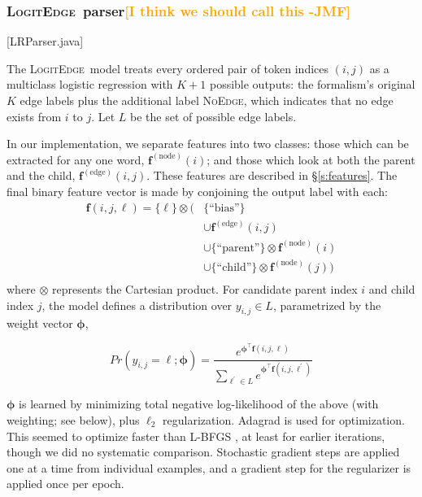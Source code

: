 \documentclass[11pt]{article}
\newcommand{\jmf}[1]{\textcolor{orange}{[#1 -JMF]}}
\newcommand{\codenote}[1]{\textcolor{PineGreen}{[#1]}}
\newcommand{\logitedge}{\textsc{LogitEdge}}
\newcommand{\noedge}{\textsc{NoEdge}}
\begin{document}
\subsubsection{\logitedge\ parser\jmf{I think we should call this }}
\label{s:logitedge}


\codenote{LRParser.java}

The \logitedge\ model treats every ordered pair of token indices $(i, j)$ as a
multiclass logistic regression with $K+1$ possible outputs:
the formalism's original $K$ edge labels plus the additional label \noedge,
which indicates that no edge exists from $i$ to $j$.
Let $L$ be the set of possible edge labels.

In our implementation, we separate features into two classes:
those which can be extracted for any one word, $\bm{f}^{(\text{node})}(i)$;
and those which look at both the parent and the child,
$\bm{f}^{(\text{edge})}(i, j)$.
These features are described in \S\ref{s:features}.
The final binary feature vector is made by conjoining the output label with
each:
\begin{align*} 
\bm{f}(i, j, \ell) =
\{ \ell \} \otimes (& 
	\{ \text{``bias''} \} \\
	& \cup \bm{f}^{(\text{edge})}(i, j) \\
	& \cup \{ \text{``parent''} \} \otimes \bm{f}^{(\text{node})}(i) \\
	& \cup \{ \text{``child''} \} \otimes \bm{f}^{(\text{node})}(j)
)\\
\end{align*}
\noindent
where  $\otimes$ represents the Cartesian product.
For candidate parent index $i$ and child index $j$, the model defines a
distribution over $y_{i,j} \in L$, parametrized by the weight vector $\bm\phi$,

\begin{equation}
  Pr(y_{i,j}=\ell; \bm\phi)  = \frac{
  	e^{\bm\phi^\top \bm{f}(i, j, \ell)}
  } {
  	\sum_{\ell^\prime \in L} {
  		e^{\bm\phi^\top \bm{f}(i, j, \ell^\prime)}
  	}
  }
\end{equation}

\noindent
$\bm\phi$ is learned by minimizing total negative log-likelihood of the above
(with weighting; see below), plus $\ell_2$ regularization.
Adagrad \cite{duchi_adaptive_2011} is used for optimization.
This seemed to optimize faster than L-BFGS \cite{byrd_limited_1995}, at least for earlier
iterations, though we did no systematic comparison. Stochastic gradient steps are applied one at a time from individual examples, and a gradient step for the regularizer is applied once per epoch.
\end{document}
